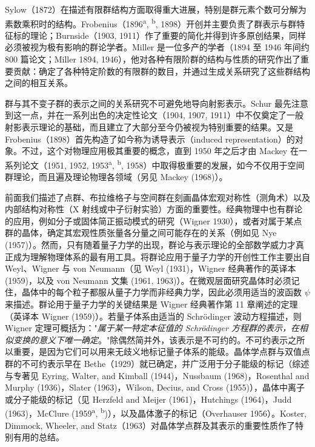 Sylow（1872）在描述有限群结构方面取得重大进展，特别是群元素个数可分解为素数乘积时的结构。Frobenius（1896\textsuperscript{a}, \textsuperscript{b}, 1898）开创并主要负责了群表示与群特征标的理论；Burnside（1903, 1911）作了重要的简化并得到许多原创结果，同样必须被视为极有影响的群论学者。Miller 是一位多产的学者（1894 至 1946 年间约 800 篇论文；Miller 1894, 1946），他对各种有限阶群的结构与性质的研究作出了重要贡献：确定了各种特定阶数的有限群的数目，并通过生成关系研究了这些群结构之间的相互关系。

群与其不变子群的表示之间的关系研究不可避免地导向射影表示。Schur 最先注意到这一点，并在一系列出色的决定性论文（1904, 1907, 1911）中不仅奠定了一般射影表示理论的基础，而且建立了大部分至今仍被视为特别重要的结果。又是 Frobenius（1898）首先构造了如今称为诱导表示（induced representation）的对象。不过，这个对物理应用极其重要的概念，直到 1950 年之后才由 Mackey 在一系列论文（1951, 1952, 1953\textsuperscript{a}, \textsuperscript{b}, 1958）中取得极重要的发展，如今不仅用于空间群理论，而且遍及理论物理各领域（另见 Mackey (1968)）。

前面我们描述了点群、布拉维格子与空间群在刻画晶体宏观对称性（测角术）以及内部结构对称性（X 射线或中子衍射实验）方面的重要性。经典物理中也有群论的应用，例如分子或固体简正振动模式的研究（Wigner 1930），或者对属于某点群的晶体，确定其宏观性质张量各分量之间可能存在的关系（例如见 Nye (1957)）。然而，只有随着量子力学的出现，群论与表示理论的全部数学威力才真正成为理解物理体系的最有用工具。将群论应用于量子力学的开创性工作主要出自 Weyl、Wigner 与 von Neumann（见 Weyl (1931)，Wigner 经典著作的英译本 (1959)，以及 von Neumann 文集 (1961, 1963)）。在微观层面研究晶体时必须记住，晶体中的每个粒子都服从量子力学而非经典力学，因此必须用适当的波函数 $\psi$ 来描述。群论用于量子力学的关键结果是 Wigner 经典著作第 11 章阐述的定理（英译本 Wigner (1959)）。若量子体系由适当的 Schrödinger 波动方程描述，则 Wigner 定理可概括为："\textit{属于某一特定本征值的 Schrödinger 方程群的表示，在相似变换的意义下唯一确定}。"除偶然简并外，该表示是不可约的。不可约表示之所以重要，是因为它们可以用来无歧义地标记量子体系的能级。晶体学点群与双值点群的不可约表示早在 Bethe（1929）就已确定，并广泛用于分子能级的标记（综述与专著见 Eyring, Walter, and Kimball (1944)，Nussbaum (1968)，Rosenthal and Murphy (1936)，Slater (1963)，Wilson, Decius, and Cross (1955)），晶体中离子或分子能级的标记（见 Herzfeld and Meijer (1961)，Hutchings (1964)，Judd (1963)，McClure (1959\textsuperscript{a}, \textsuperscript{b})），以及晶体激子的标记（Overhauser 1956）。Koster, Dimmock, Wheeler, and Statz（1963）对晶体学点群及其表示的重要性质作了特别有用的总结。

